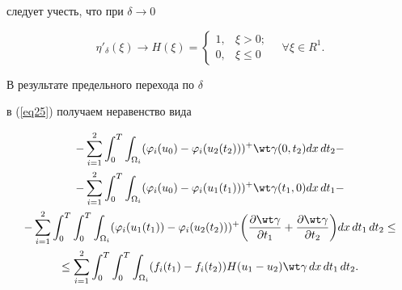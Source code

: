 \begin{pf}
следует учесть, что при $\delta\rightarrow 0$ 


$$ 


\eta '_{\delta}(\xi) \rightarrow H (\xi)=


\begin{cases}


1, & \xi > 0; \\


0, & \xi \leq 0


\end{cases}


\quad \forall \xi \in R^{1}.


$$





В результате предельного перехода по $\delta$


в (\ref{eq25}) получаем неравенство вида


\begin{multline} 


\label{eq32} 


-\sum_{i=1}^{2} \int_{0}^{T} \int_{\Omega_{i}}


({\varphi_{i}(u_{0})-\varphi_{i}(u_{2}(t_{2}))})^{+}


\wt \gamma (0, t_{2}) dx\, dt_{2}- \\


%


-\sum_{i=1}^{2} \int_{0}^{T} \int_{\Omega_{i}}


({\varphi_{i}(u_{0})-\varphi_{i}(u_{1}(t_{1}))})^{+}


\wt \gamma (t_{1},0) dx\, dt_{1}- \\


%


-\sum_{i=1}^{2} \int_{0}^{T} \int_{0}^{T} \int_{\Omega_{i}}


({\varphi_{i}(u_{1}(t_{1}))-\varphi_{i}(u_{2}(t_{2}))})^{+}


\bigg({\frac{\partial \wt \gamma}{\partial t_{1}}+


\frac{\partial \wt \gamma}{\partial t_{2}}} \bigg) 


dx\, dt_{1}\, dt_{2} \leq \\


%


\leq \sum_{i=1}^{2} \int_{0}^{T} \int_{0}^{T} \int_{\Omega_{i}}


(f_i(t_{1})-f_i(t_{2})) H(u_{1}-u_{2}) \wt \gamma\,dx\, dt_{1}\, dt_{2}. 


\end{multline}



\end{pf}
